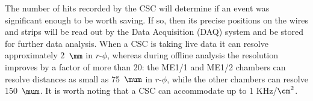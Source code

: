 The number of hits recorded by the CSC will determine if an event was significant enough to be worth saving.
If so, then its precise positions on the wires and strips will be read out by the Data Acquisition (DAQ) system and be stored for further data analysis.
When a CSC is taking live data it can resolve approximately 2~$\mm$ in $r$-$\phi$, whereas during offline analysis the resolution improves by a factor of more than 20:
the ME1/1 and ME1/2 chambers can resolve distances as small as 75~$\mum$ in $r$-$\phi$, while the other chambers can resolve 150~$\mum$.
It is worth noting that a CSC can accommodate up to 1 KHz/$\cm^2$.








